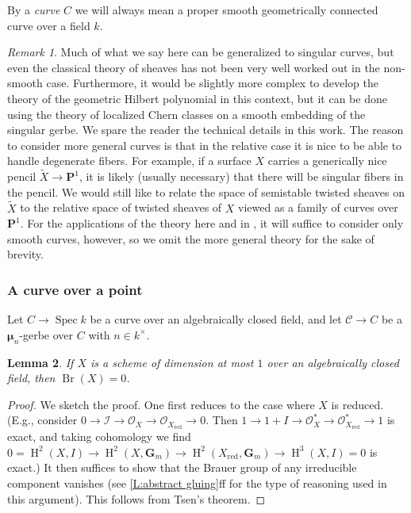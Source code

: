 \documentclass[11pt]{amsart}
\newcommand{\field}[1]{\mathbf #1}
\newcommand{\ms}[1]{\mathscr #1}
\newcommand{\spec}{\operatorname{Spec}}
\renewcommand{\P}{\field P}
\newcommand{\m}{\boldsymbol{\mu}}
\newcommand{\G}{\field G} %
\renewcommand{\H}{\operatorname{H}}
\renewcommand{\[}{[\!\hspace{0.03em}[}
\renewcommand{\]}{]\!\hspace{0.03em}]}
\renewcommand{\(}{(\!\hspace{0.03em}(}
\renewcommand{\)}{)\!\hspace{0.03em})}
\DeclareMathOperator{\Br}{\operatorname{Br}}
\newtheorem{lem}{Lemma}[subsubsection]%
\theoremstyle{definition}
\theoremstyle{remark}
\newtheorem{remark}[lem]{Remark}
\begin{document}
By a \emph{curve\/} $C$ we will always mean a proper smooth geometrically connected curve over a field $k$.  

\begin{remark}
Much of what we say here can be generalized to singular curves, but even the classical theory of sheaves has not been 
very well worked out in the non-smooth case.  Furthermore, it would be slightly more complex to develop the theory of the geometric Hilbert polynomial in this context, but it can be done using the theory of localized Chern classes on a smooth embedding of the singular gerbe.  We spare the reader the technical details in this work.  The 
reason to consider more general curves is that in the 
relative case it is nice to be able to handle degenerate fibers.  For 
example, if a surface $X$ carries a generically nice pencil 
$\widetilde X\to\P^{1}$, it is likely 
(usually necessary) that there will be singular fibers in the pencil.  
We would still like to relate the space of semistable twisted sheaves 
on $\widetilde{X}$ to the relative space of twisted sheaves of $X$ viewed as a 
family of curves over $\P^{1}$.  For the applications of the theory here and in \cite{period-index-paper}, it will suffice to consider only smooth curves, however, so we omit the more general theory for the sake of brevity.
\end{remark}

\subsubsection{A curve over a point}
Let $C\to\spec k$ be a curve over an algebraically closed field, and let 
$\ms C\to C$ be a $\m_{n}$-gerbe over $C$ with $n\in k^{\times}$.

\begin{lem} If $X$ is a scheme of dimension at most $1$ over an algebraically closed field, then $\Br(X)=0$.
\end{lem}
\begin{proof} We sketch the proof.  One first reduces to the case 
where $X$ is reduced.  (E.g., consider $0\to\ms 
I\to{\ms O}_{X}\to{\ms O}_{X_{\text{red}}}\to 0$.  Then $1\to 
1+I\to{\ms O}_{X}^{\ast}\to{\ms O}_{X_{\text{red}}}^{\ast}\to 1$ is exact, and 
taking cohomology we find 
$0=\H^{2}(X,I)\to\H^{2}(X,\G_{m})\to\H^{2}(X_{\text{red}},\G_{m})\to\H^{3}(X,I)=0$ is exact.)  
It then suffices to show that the 
Brauer group of any irreducible component vanishes (see 
\ref{L:abstract gluing}ff for the type of reasoning used in this 
argument).  This follows from Tsen's theorem.
\end{proof}
\end{document}
